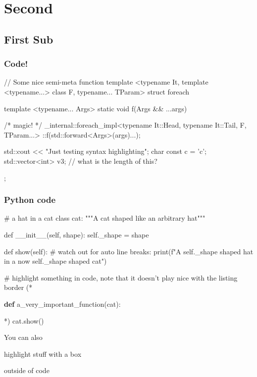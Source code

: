 \documentclass[mathserif, fleqn, aspectratio=169]{beamer}
\begin{document}
\section{Second}
\subsection{First Sub}
\begin{frame}[fragile]\frametitle{Code!}
  \begin{cppcode}[caption={A test \cpp listing}]
// Some nice semi-meta function
template <typename It,
          template <typename...> class F,
          typename... TParam>
struct foreach {
  template <typename... Args>
  static void f(Args && ...args) {
    /* magic! */
    _internal::foreach_impl<typename It::Head,
                            typename It::Tail,
                            F,
                            TParam...>
        ::f(std::forward<Args>(args)...);

    std::cout << "Just testing syntax highlighting\n";
    char const c = 'c';
    std::vector<int> v{3};  // what is the length of this?
  }
};
  \end{cppcode}
\end{frame}

\begin{frame}[fragile]\frametitle{{\dvfamily Python} code}
  \begin{pycode}[caption={Some Python as well}]
# a hat in a cat
class cat:
  """A cat shaped like an arbitrary hat"""

  def __init__(self, shape):
    self._shape = shape

  def show(self):
    # watch out for auto line breaks:
    print(f"A {self._shape} shaped hat in a now {self._shape} shaped cat")

# highlight something in code, note that it doesn't play nice with the listing border
(*\hspace{-1.5mm}\begin{highlightbox}{}{\bfseries\color{aiphiblue!75!white}def} a\_very\_important\_function(cat):\end{highlightbox}*)
  cat.show()
\end{pycode}

{\scriptsize
  You can also
  \begin{highlightbox}{}\sffamily
    highlight stuff with a box
  \end{highlightbox}
  outside of code
}
\end{frame}
\end{document}
